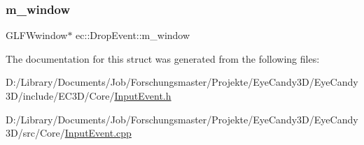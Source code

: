 \subsubsection{\texorpdfstring{m\+\_\+window}{m\_window}}
{\footnotesize\ttfamily G\+L\+F\+Wwindow$\ast$ ec\+::\+Drop\+Event\+::m\+\_\+window}



The documentation for this struct was generated from the following files\+:\begin{DoxyCompactItemize}
\item 
D\+:/\+Library/\+Documents/\+Job/\+Forschungsmaster/\+Projekte/\+Eye\+Candy3\+D/\+Eye\+Candy3\+D/include/\+E\+C3\+D/\+Core/\mbox{\hyperlink{_input_event_8h}{Input\+Event.\+h}}\item 
D\+:/\+Library/\+Documents/\+Job/\+Forschungsmaster/\+Projekte/\+Eye\+Candy3\+D/\+Eye\+Candy3\+D/src/\+Core/\mbox{\hyperlink{_input_event_8cpp}{Input\+Event.\+cpp}}\end{DoxyCompactItemize}

